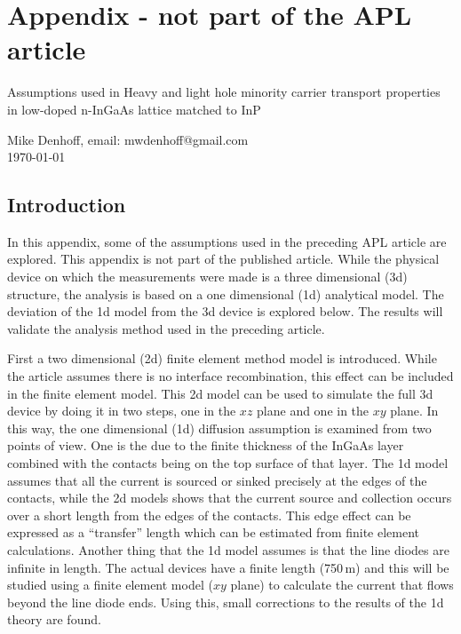 
\onecolumngrid
\newpage

\section{Appendix - not part of the APL article}
\pagestyle{append}

\Large
\noindent Assumptions used in Heavy and light hole minority carrier transport
 properties in low-doped n-InGaAs lattice matched to InP \\[0ex]
\normalsize
\begin{center}
Mike Denhoff, email: mwdenhoff@gmail.com \\
\today \\[2ex]
\end{center}

\twocolumngrid


\subsection{Introduction}

In this appendix, some of the assumptions used in the preceding APL article
 are explored.  This appendix is not part of the published article.
While the physical device on which the measurements were made is a
three dimensional (3d) structure,  the analysis is based on a one dimensional
(1d) analytical model.
The deviation of the 1d model from the 3d device is explored below.
The results will validate the analysis method used in the preceding article.

First a two dimensional (2d) finite element method model is introduced.
  While the article assumes
 there is no interface recombination, this effect can be included in the
 finite element model.
This 2d model can be used to simulate the full 3d device by doing it in
two steps, one in the $xz$ plane and one in the $xy$ plane.  
In this way, the one dimensional (1d) diffusion assumption is examined from two
 points of view.  One is the due to the finite thickness of the InGaAs layer
combined with the contacts being on the top surface of that layer.
The 1d model assumes that all the current is sourced or sinked precisely
at the edges of the contacts, while the 2d models shows 
 that the current source and collection occurs over a short length
from the edges of the contacts.  This edge effect can be expressed as
a ``transfer'' length which can be
estimated from finite element calculations.
Another thing that the 1d model assumes is that the line diodes are infinite
in length.  The actual devices have a finite length (750\,\textmu m) and
this will be studied using a finite element model ($xy$ plane) to calculate
the current that flows beyond the line diode ends.  Using this, small
corrections to the results of the 1d theory are found.

